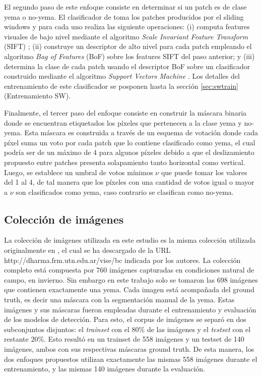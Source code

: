 \documentclass[a4paper,authoryear,review]{elsarticle}
\begin{document}
El segundo paso de este enfoque consiste en determinar si un patch es de clase yema o no-yema. El clasificador de \citet{perez2017image} toma los patches producidos por el sliding windows y para cada uno realiza las siguiente operaciones: (i) computa features visuales de bajo nivel mediante el algoritmo \emph{Scale Invariant Feature Transform} (SIFT) \cite{lowe2004distinctive}; (ii) construye un descriptor de alto nivel para cada patch empleando el algoritmo \emph{Bag of Features} (BoF) \cite{csurka2004visual} sobre los features SIFT del paso anterior; y (iii) determina la clase de cada patch usando el descriptor BoF sobre un clasificador construido mediante el algoritmo \emph{Support Vectors Machine} \cite{vapnik2013nature}. Los detalles del entrenamiento de este clasificador se posponen hasta la sección \ref{sec:swtrain} (Entrenamiento SW).

Finalmente, el tercer paso del enfoque consiste en construir la máscara binaria donde se encuentran etiquetados los píxeles que pertenecen a la clase yema y no-yema. Esta máscara es construida a través de un esquema de votación donde cada píxel suma un voto por cada patch que lo contiene clasificado como yema, el cual podría ser de un máximo de 4 para algunos píxeles debido a que el deslizamiento propuesto entre patches presenta solapamiento tanto horizontal como vertical. Luego, se establece un umbral de votos mínimos $\nu$ que puede tomar los valores del 1 al 4, de tal manera que los píxeles con una cantidad de votos igual o mayor a $\nu$ son clasificados como yema, caso contrario se clasifican como no-yema.

\subsection{Colección de imágenes}
\label{sec:corpus}

La colección de imágenes utilizada en este estudio es la misma colección utilizada originalmente en \citet{perez2017image}, el cual se ha descargado de la URL http://dharma.frm.utn.edu.ar/vise/bc indicada por los autores. La colección completo está compuesta por 760 imágenes capturadas en condiciones natural de campo, en invierno. Sin embargo en este trabajo solo se tomaron las 698 imágenes que contienen exactamente una yema. Cada imagen está acompañada del ground truth, es decir una máscara con la segmentación manual de la yema. Estas imágenes y sus máscaras fueron empleadas durante el entrenamiento y evaluación de los modelos de detección. Para esto, el corpus de imágenes se separó en dos subconjuntos disjuntos: el \emph{trainset} con el $80\%$ de las imágenes y el \emph{testset} con el restante $20\%$. Esto resultó en un trainset de 558 imágenes y un testset de 140 imágenes, ambos con sus respectivas máscaras ground truth. De esta manera, los dos enfoques propuestos utilizan exactamente las mismas 558 imágenes durante el entrenamiento, y las mismas 140 imágenes durante la evaluación.
\end{document}
